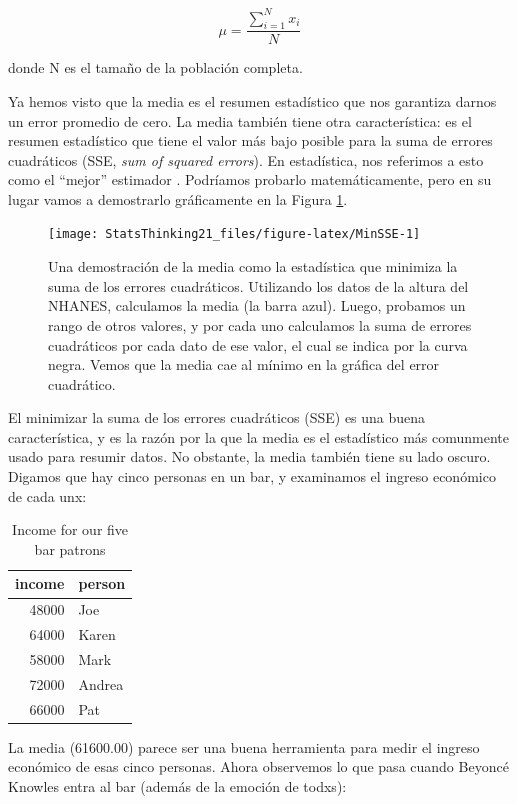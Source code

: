\documentclass[
  12pt,
]{book}
\theoremstyle{definition}
\theoremstyle{definition}
\theoremstyle{definition}
\theoremstyle{remark}
\begin{document}
\[
\mu = \frac{\sum_{i=1}^{N}x_i}{N}
\]

donde N es el tamaño de la población completa.

Ya hemos visto que la media es el resumen estadístico que nos garantiza darnos un error promedio de cero. La media también tiene otra característica: es el resumen estadístico que tiene el valor más bajo posible para la suma de errores cuadráticos (SSE, \emph{sum of squared errors}). En estadística, nos referimos a esto como el ``mejor'' estimador . Podríamos probarlo matemáticamente, pero en su lugar vamos a demostrarlo gráficamente en la Figura \ref{fig:MinSSE}.

\begin{figure}
\texttt{[image: StatsThinking21\_files/figure-latex/MinSSE-1]} \caption{Una demostración de la media como la estadística que minimiza la suma de los errores cuadráticos. Utilizando los datos de la altura del NHANES, calculamos la media (la barra azul). Luego, probamos un rango de otros valores, y por cada uno calculamos la suma de errores cuadráticos por cada dato de ese valor, el cual se indica por la curva negra. Vemos que la media cae al mínimo en la gráfica del error cuadrático.}\label{fig:MinSSE}
\end{figure}

El minimizar la suma de los errores cuadráticos (SSE) es una buena característica, y es la razón por la que la media es el estadístico más comunmente usado para resumir datos. No obstante, la media también tiene su lado oscuro. Digamos que hay cinco personas en un bar, y examinamos el ingreso económico de cada unx:

\begin{table}

\caption{\label{tab:unnamed-chunk-17}Income for our five bar patrons}
\centering
\begin{tabular}[t]{r|l}
\hline
income & person\\
\hline
48000 & Joe\\
\hline
64000 & Karen\\
\hline
58000 & Mark\\
\hline
72000 & Andrea\\
\hline
66000 & Pat\\
\hline
\end{tabular}
\end{table}

La media (61600.00) parece ser una buena herramienta para medir el ingreso económico de esas cinco personas. Ahora observemos lo que pasa cuando Beyoncé Knowles entra al bar (además de la emoción de todxs):
\end{document}
